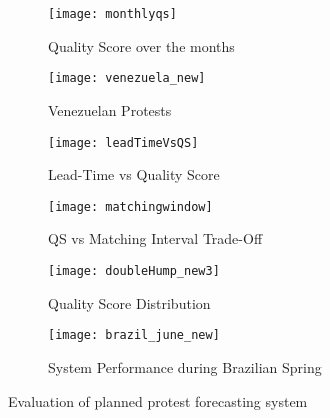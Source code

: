 \begin{figure*}
\begin{subfigure}{.70\columnwidth}
    \centering
  \texttt{[image: monthlyqs]}
  \caption{\scriptsize Quality Score over the months}
  \label{fig:monthlyqs}
\end{subfigure}\hspace{.5pt}
\begin{subfigure}{.70\columnwidth}
    \centering
  \texttt{[image: venezuela\_new]}
  \caption{\scriptsize Venezuelan Protests}
  \label{fig:venezuela_feb}
\end{subfigure}\hspace{.5pt}
\begin{subfigure}{.70\columnwidth}
    \centering
  \texttt{[image: leadTimeVsQS]}
  \caption{\scriptsize Lead-Time vs Quality Score}
  \label{fig:leadTimeVsQS}
\end{subfigure}

\begin{subfigure}{.70\columnwidth}
    \centering
  \texttt{[image: matchingwindow]}
  \caption{\scriptsize QS vs Matching Interval Trade-Off}
  \label{fig:matchinginterval}
\end{subfigure}\hspace{.5pt}
\begin{subfigure}{.70\columnwidth}
    \centering
  \texttt{[image: doubleHump\_new3]}
  \caption{\scriptsize Quality Score Distribution}
  \label{fig:doubleHump}
\end{subfigure}\hspace{.5pt}
\begin{subfigure}{.70\columnwidth}
    \centering
  \texttt{[image: brazil\_june\_new]}
  \caption{\scriptsize System Performance during Brazilian Spring}
  \label{fig:brazil_june}
\end{subfigure}\hspace{.5pt}
\caption{Evaluation of planned protest forecasting system}
\end{figure*}



